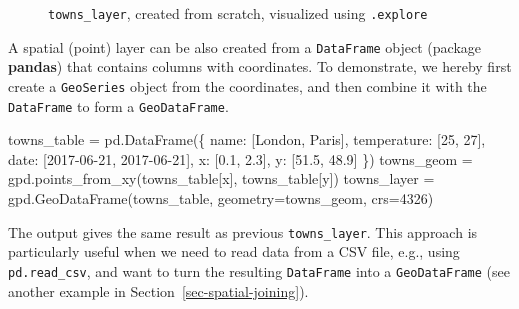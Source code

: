 \documentclass[
  letterpaper,
]{krantz}
\newenvironment{Shaded}{\begin{snugshade}}{\end{snugshade}}
\newcommand{\DecValTok}[1]{\textcolor[rgb]{0.68,0.00,0.00}{#1}}
\newcommand{\FloatTok}[1]{\textcolor[rgb]{0.68,0.00,0.00}{#1}}
\newcommand{\NormalTok}[1]{\textcolor[rgb]{0.00,0.23,0.31}{#1}}
\newcommand{\OperatorTok}[1]{\textcolor[rgb]{0.37,0.37,0.37}{#1}}
\newcommand{\StringTok}[1]{\textcolor[rgb]{0.13,0.47,0.30}{#1}}
\begin{document}
\begin{figure}


\caption{\label{fig-layer-from-scratch-explore}\texttt{towns\_layer},
created from scratch, visualized using \texttt{.explore}}

\end{figure}%

A spatial (point) layer can be also created from a \texttt{DataFrame}
object (package \textbf{pandas}) that contains columns with coordinates.
To demonstrate, we hereby first create a \texttt{GeoSeries} object from
the coordinates, and then combine it with the \texttt{DataFrame} to form
a \texttt{GeoDataFrame}.

\begin{Shaded}
\begin{Highlighting}[]
\NormalTok{towns\_table }\OperatorTok{=}\NormalTok{ pd.DataFrame(\{}
  \StringTok{\textquotesingle{}name\textquotesingle{}}\NormalTok{: [}\StringTok{\textquotesingle{}London\textquotesingle{}}\NormalTok{, }\StringTok{\textquotesingle{}Paris\textquotesingle{}}\NormalTok{],}
  \StringTok{\textquotesingle{}temperature\textquotesingle{}}\NormalTok{: [}\DecValTok{25}\NormalTok{, }\DecValTok{27}\NormalTok{],}
  \StringTok{\textquotesingle{}date\textquotesingle{}}\NormalTok{: [}\StringTok{\textquotesingle{}2017{-}06{-}21\textquotesingle{}}\NormalTok{, }\StringTok{\textquotesingle{}2017{-}06{-}21\textquotesingle{}}\NormalTok{],}
  \StringTok{\textquotesingle{}x\textquotesingle{}}\NormalTok{: [}\FloatTok{0.1}\NormalTok{, }\FloatTok{2.3}\NormalTok{],}
  \StringTok{\textquotesingle{}y\textquotesingle{}}\NormalTok{: [}\FloatTok{51.5}\NormalTok{, }\FloatTok{48.9}\NormalTok{]}
\NormalTok{\})}
\NormalTok{towns\_geom }\OperatorTok{=}\NormalTok{ gpd.points\_from\_xy(towns\_table[}\StringTok{\textquotesingle{}x\textquotesingle{}}\NormalTok{], towns\_table[}\StringTok{\textquotesingle{}y\textquotesingle{}}\NormalTok{])}
\NormalTok{towns\_layer }\OperatorTok{=}\NormalTok{ gpd.GeoDataFrame(towns\_table, geometry}\OperatorTok{=}\NormalTok{towns\_geom, crs}\OperatorTok{=}\DecValTok{4326}\NormalTok{)}
\end{Highlighting}
\end{Shaded}

The output gives the same result as previous \texttt{towns\_layer}. This
approach is particularly useful when we need to read data from a CSV
file, e.g., using \texttt{pd.read\_csv}, and want to turn the resulting
\texttt{DataFrame} into a \texttt{GeoDataFrame} (see another example in
Section~\ref{sec-spatial-joining}).
\end{document}
